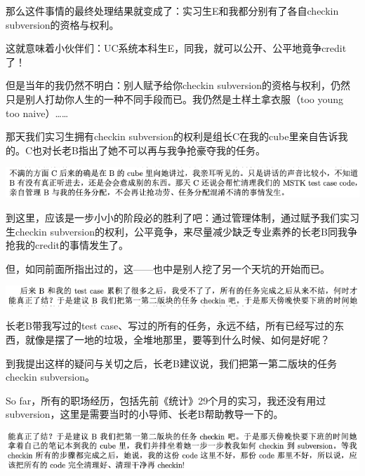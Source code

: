 \documentclass[9pt, b5paper]{article}
\begin{document}
那么这件事情的最终处理结果就变成了：实习生E和我都分别有了各自checkin subversion的资格与权利。

这就意味着小伙伴们：UC系统本科生E，同我，就可以公开、公平地竟争credit了！

但是当年的我仍然不明白：别人赋予给你checkin subversion的资格与权利，仍然只是别人打劫你人生的一种不同手段而已。我仍然是土样土拿衣服（too young too naive）\ldots{}\ldots{}

那天我们实习生拥有checkin subversion的权利是组长C在我的cube里亲自告诉我的。C也对长老B指出了她不可以再与我争抢豪夺我的任务。

\begin{center}
\includegraphics[width=.9\linewidth]{./pic/backups_plans_20210505_134738.png}
\end{center}

到这里，应该是一步小小的阶段必的胜利了吧：通过管理体制，通过赋予我们实习生checkin subversion的权利，公平竟争，来尽量减少缺乏专业素养的长老B同我争抢我的credit的事情发生了。

但，如同前面所指出过的，这——也中是别人挖了另一个天坑的开始而已。

\begin{center}
\includegraphics[width=.9\linewidth]{./pic/backups_plans_20210505_100918.png}
\end{center}

长老B带我写过的test case、写过的所有的任务，永远不结，所有已经写过的东西，就像是摆了一地的垃圾，全堆地那里，要等到什么时候、如何是好呢？

到我提出这样的疑问与关切之后，长老B建议说，我们把第一第二版块的任务checkin subversion。

So far，所有的职场经历，包括先前《统计》29个月的实习，我还没有用过subversion，这里是需要当时的小导师、长老B帮助教导一下的。 

\begin{center}
\includegraphics[width=.9\linewidth]{./pic/backups_plans_20210505_135942.png}
\end{center}
\end{document}
